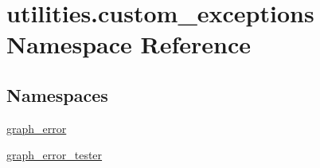 \hypertarget{namespaceutilities_1_1custom__exceptions}{}\section{utilities.\+custom\+\_\+exceptions Namespace Reference}
\label{namespaceutilities_1_1custom__exceptions}
\subsection*{Namespaces}
\begin{DoxyCompactItemize}
\item 
 \hyperlink{namespaceutilities_1_1custom__exceptions_1_1graph__error}{graph\+\_\+error}
\item 
 \hyperlink{namespaceutilities_1_1custom__exceptions_1_1graph__error__tester}{graph\+\_\+error\+\_\+tester}
\end{DoxyCompactItemize}
